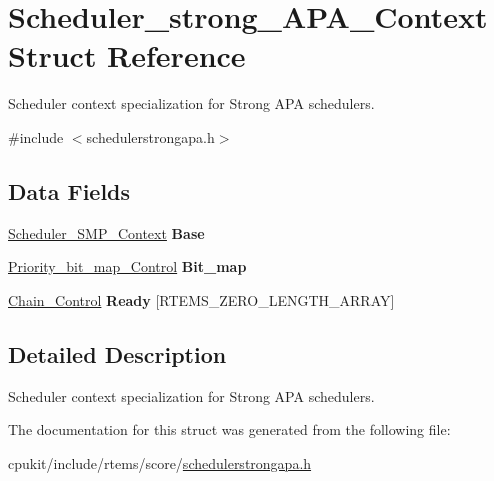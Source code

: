 \hypertarget{structScheduler__strong__APA__Context}{}\section{Scheduler\+\_\+strong\+\_\+\+A\+P\+A\+\_\+\+Context Struct Reference}
\label{structScheduler__strong__APA__Context}


Scheduler context specialization for Strong A\+PA schedulers.  




{\ttfamily \#include $<$schedulerstrongapa.\+h$>$}

\subsection*{Data Fields}
\begin{DoxyCompactItemize}
\item 
\mbox{\label{structScheduler__strong__APA__Context_a55755b445b7e7beaf1b87b178521e615}} 
\mbox{\hyperlink{structScheduler__SMP__Context}{Scheduler\+\_\+\+S\+M\+P\+\_\+\+Context}} {\bfseries Base}
\item 
\mbox{\label{structScheduler__strong__APA__Context_a9badd7913f0d579b26324c254a5748b8}} 
\mbox{\hyperlink{structPriority__bit__map__Control}{Priority\+\_\+bit\+\_\+map\+\_\+\+Control}} {\bfseries Bit\+\_\+map}
\item 
\mbox{\label{structScheduler__strong__APA__Context_a84b33e59f13bdad12a984bc11daf9ab9}} 
\mbox{\hyperlink{unionChain__Control}{Chain\+\_\+\+Control}} {\bfseries Ready} \mbox{[}R\+T\+E\+M\+S\+\_\+\+Z\+E\+R\+O\+\_\+\+L\+E\+N\+G\+T\+H\+\_\+\+A\+R\+R\+AY\mbox{]}
\end{DoxyCompactItemize}


\subsection{Detailed Description}
Scheduler context specialization for Strong A\+PA schedulers. 

The documentation for this struct was generated from the following file\+:\begin{DoxyCompactItemize}
\item 
cpukit/include/rtems/score/\mbox{\hyperlink{schedulerstrongapa_8h}{schedulerstrongapa.\+h}}\end{DoxyCompactItemize}
